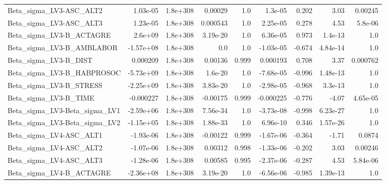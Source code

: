 \begin{tabular}{lrrrrrrrr}
Beta\_sigma\_LV3-ASC\_ALT2       &    1.03e-05 &     1.8e+308 &   0.00029 &      1.0 &    1.3e-05 &       0.202 &         3.03 &       0.00245 \\
Beta\_sigma\_LV3-ASC\_ALT3       &    1.23e-05 &     1.8e+308 &  0.000543 &      1.0 &   2.25e-05 &       0.278 &         4.53 &       5.8e-06 \\
Beta\_sigma\_LV3-B\_ACTAGRE      &     2.6e+09 &     1.8e+308 &  3.19e-20 &      1.0 &   6.36e-05 &       0.973 &      1.4e-13 &           1.0 \\
Beta\_sigma\_LV3-B\_AMBLABOR     &   -1.57e+08 &     1.8e+308 &       0.0 &      1.0 &  -1.03e-05 &      -0.674 &     4.84e-14 &           1.0 \\
Beta\_sigma\_LV3-B\_DIST         &    0.000209 &     1.8e+308 &   0.00136 &    0.999 &   0.000193 &       0.708 &         3.37 &      0.000762 \\
Beta\_sigma\_LV3-B\_HABPROSOC    &   -5.73e+09 &     1.8e+308 &   1.6e-20 &      1.0 &  -7.68e-05 &      -0.996 &     1.48e-13 &           1.0 \\
Beta\_sigma\_LV3-B\_STRESS       &   -2.25e+09 &     1.8e+308 &  3.83e-20 &      1.0 &  -2.98e-05 &      -0.968 &      3.3e-13 &           1.0 \\
Beta\_sigma\_LV3-B\_TIME         &   -0.000227 &     1.8e+308 &  -0.00175 &    0.999 &  -0.000225 &      -0.776 &        -4.07 &      4.65e-05 \\
Beta\_sigma\_LV3-Beta\_sigma\_LV1 &   -2.59e+06 &     1.8e+308 &  7.56e-34 &      1.0 &  -3.73e-08 &      -0.998 &     6.23e-27 &           1.0 \\
Beta\_sigma\_LV3-Beta\_sigma\_LV2 &   -1.15e+05 &     1.8e+308 &  1.88e-33 &      1.0 &   6.96e-10 &       0.346 &     1.57e-26 &           1.0 \\
Beta\_sigma\_LV4-ASC\_ALT1       &   -1.93e-06 &     1.8e+308 &  -0.00122 &    0.999 &  -1.67e-06 &      -0.364 &        -1.71 &        0.0874 \\
Beta\_sigma\_LV4-ASC\_ALT2       &   -1.07e-06 &     1.8e+308 &   0.00312 &    0.998 &  -1.33e-06 &      -0.202 &         3.03 &       0.00246 \\
Beta\_sigma\_LV4-ASC\_ALT3       &   -1.28e-06 &     1.8e+308 &   0.00585 &    0.995 &  -2.37e-06 &      -0.287 &         4.53 &      5.84e-06 \\
Beta\_sigma\_LV4-B\_ACTAGRE      &   -2.36e+08 &     1.8e+308 &  3.19e-20 &      1.0 &  -6.56e-06 &      -0.985 &     1.39e-13 &           1.0 \\

\end{tabular}
